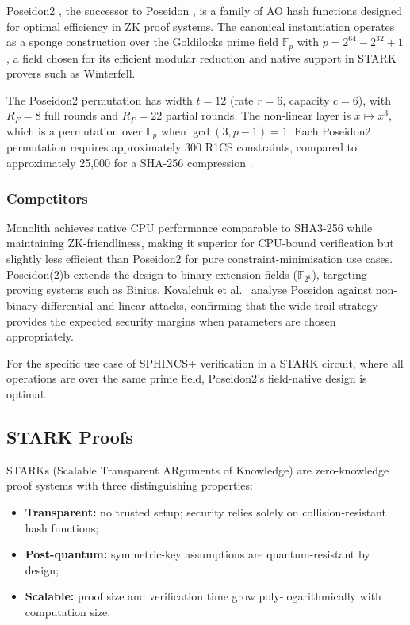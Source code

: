 \documentclass[11pt,a4paper]{article}
\newcommand{\Fp}{\mathbb{F}_p}
\begin{document}
Poseidon2 \cite{Grassi2023Poseidon2}, the successor to Poseidon \cite{Grassi2019Poseidon},
is a family of AO hash functions designed for optimal efficiency in ZK proof systems.  The
canonical instantiation operates as a sponge construction over the Goldilocks prime field
$\Fp$ with $p = 2^{64} - 2^{32} + 1$, a field chosen for its efficient modular reduction
and native support in STARK provers such as Winterfell.

The Poseidon2 permutation has width $t = 12$ (rate $r = 6$, capacity $c = 6$), with
$R_F = 8$ full rounds and $R_P = 22$ partial rounds.  The non-linear layer is
$x \mapsto x^3$, which is a permutation over $\Fp$ when $\gcd(3, p-1) = 1$.  Each Poseidon2
permutation requires approximately 300 R1CS constraints, compared to approximately 25,000 for
a SHA-256 compression \cite{Grassi2024Monolith}.

\subsubsection*{Competitors}

Monolith \cite{Grassi2024Monolith} achieves native CPU performance comparable to SHA3-256 while
maintaining ZK-friendliness, making it superior for CPU-bound verification but slightly less
efficient than Poseidon2 for pure constraint-minimisation use cases.
Poseidon(2)b \cite{Grassi2026Poseidon2b} extends the design to binary extension fields
($\mathbb{F}_{2^k}$), targeting proving systems such as Binius.
Kovalchuk et al.~\cite{2021Security} analyse Poseidon against non-binary differential and
linear attacks, confirming that the wide-trail strategy provides the expected security margins
when parameters are chosen appropriately.

For the specific use case of SPHINCS+ verification in a STARK circuit, where all operations
are over the same prime field, Poseidon2's field-native design is optimal.

\subsection{STARK Proofs}

STARKs (Scalable Transparent ARguments of Knowledge) \cite{2019DEEP} are zero-knowledge proof
systems with three distinguishing properties:
\begin{itemize}
  \item \textbf{Transparent:} no trusted setup; security relies solely on collision-resistant
        hash functions;
  \item \textbf{Post-quantum:} symmetric-key assumptions are quantum-resistant by design;
  \item \textbf{Scalable:} proof size and verification time grow poly-logarithmically with
        computation size.
\end{itemize}
\end{document}
